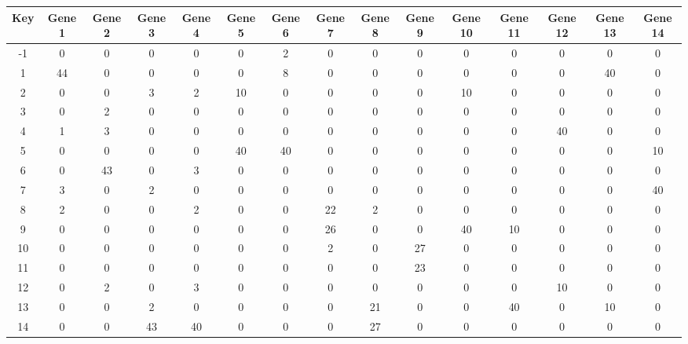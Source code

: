 \begin{tabular}{|c|c|c|c|c|c|c|c|c|c|c|c|c|c|c|}
\hline
Key & Gene 1 & Gene 2 & Gene 3 & Gene 4 & Gene 5 & Gene 6 & Gene 7 & Gene 8 & Gene 9 & Gene 10 & Gene 11 & Gene 12 & Gene 13 & Gene 14 \\
\hline
-1 & 0 & 0 & 0 & 0 & 0 & 2 & 0 & 0 & 0 & 0 & 0 & 0 & 0 & 0 \\
1 & 44 & 0 & 0 & 0 & 0 & 8 & 0 & 0 & 0 & 0 & 0 & 0 & 40 & 0 \\
2 & 0 & 0 & 3 & 2 & 10 & 0 & 0 & 0 & 0 & 10 & 0 & 0 & 0 & 0 \\
3 & 0 & 2 & 0 & 0 & 0 & 0 & 0 & 0 & 0 & 0 & 0 & 0 & 0 & 0 \\
4 & 1 & 3 & 0 & 0 & 0 & 0 & 0 & 0 & 0 & 0 & 0 & 40 & 0 & 0 \\
5 & 0 & 0 & 0 & 0 & 40 & 40 & 0 & 0 & 0 & 0 & 0 & 0 & 0 & 10 \\
6 & 0 & 43 & 0 & 3 & 0 & 0 & 0 & 0 & 0 & 0 & 0 & 0 & 0 & 0 \\
7 & 3 & 0 & 2 & 0 & 0 & 0 & 0 & 0 & 0 & 0 & 0 & 0 & 0 & 40 \\
8 & 2 & 0 & 0 & 2 & 0 & 0 & 22 & 2 & 0 & 0 & 0 & 0 & 0 & 0 \\
9 & 0 & 0 & 0 & 0 & 0 & 0 & 26 & 0 & 0 & 40 & 10 & 0 & 0 & 0 \\
10 & 0 & 0 & 0 & 0 & 0 & 0 & 2 & 0 & 27 & 0 & 0 & 0 & 0 & 0 \\
11 & 0 & 0 & 0 & 0 & 0 & 0 & 0 & 0 & 23 & 0 & 0 & 0 & 0 & 0 \\
12 & 0 & 2 & 0 & 3 & 0 & 0 & 0 & 0 & 0 & 0 & 0 & 10 & 0 & 0 \\
13 & 0 & 0 & 2 & 0 & 0 & 0 & 0 & 21 & 0 & 0 & 40 & 0 & 10 & 0 \\
14 & 0 & 0 & 43 & 40 & 0 & 0 & 0 & 27 & 0 & 0 & 0 & 0 & 0 & 0 \\
\hline
\end{tabular}